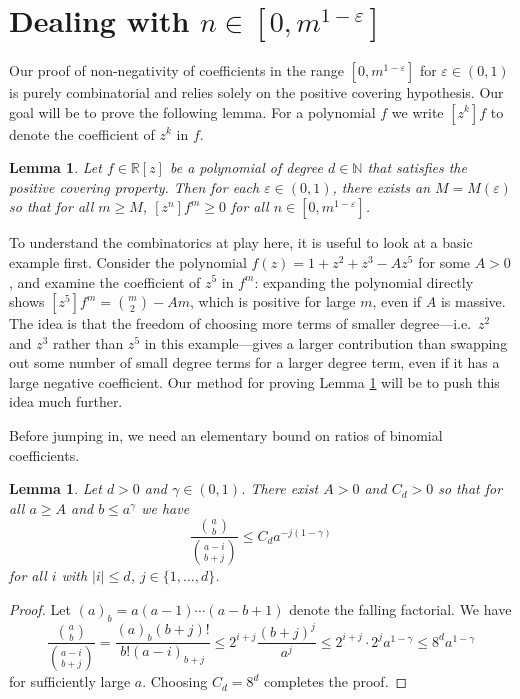 \documentclass{daj}
\def\eps{\varepsilon}
\newcommand{\R}{\mathbb{R}}
\def\N{\mathbb{N}}
\newtheorem{lemma}[theorem]{Lemma}
\theoremstyle{definition}
\theoremstyle{remark}
\begin{document}
\section{Dealing with $n \in [0,m^{1-\eps}]$} \label{sec:small-coefficients}

Our proof of non-negativity of coefficients in the range $[0,m^{1-\eps}]$ for $\eps \in (0,1)$ is purely combinatorial and relies solely on the positive covering hypothesis.  Our goal will be to prove the following lemma.  For a polynomial $f$ we write $[z^k] f$ to denote the coefficient of $z^k$ in $f$. 

\begin{lemma}\label{lem:poly-many}
	Let $f \in \R[z]$ be a polynomial of degree $d \in \N$ that satisfies the positive covering property.  Then for each $\eps \in (0,1)$, there exists an $M = M(\eps)$ so that for all $m \geq M$, $[z^n] f^m \geq 0$ for all $n \in [0, m^{1-\eps}]$. 
\end{lemma}

To understand the combinatorics at play here, it is useful to look at a basic example first.  Consider the polynomial $f(z) = 1 + z^2 + z^3 - Az^5$ for some $A > 0$, and examine the coefficient of $z^5$ in $f^m$: expanding the polynomial directly shows $[z^5] f^m = \binom{m}{2} - A m$, which is positive for large $m$, even if $A$ is massive.  The idea is that the freedom of choosing more terms of smaller degree---i.e.~$z^2$ and $z^3$ rather than $z^5$ in this example---gives a larger contribution than swapping out some number of small degree terms for a larger degree term, even if it has a large negative coefficient. Our method for proving Lemma \ref{lem:poly-many} will be to push this idea much further. 

Before jumping in, we need an elementary bound on ratios of binomial coefficients.

\begin{lemma}\label{lem:gen-binomial-bound}
	Let $d > 0$ and $\gamma \in (0,1)$.  There exist $A > 0$  and $C_d > 0$ so that for all $a \geq A$ and $b \leq a^{\gamma}$ we have $$\frac{\binom{a}{b}}{\binom{a-i}{b + j}} \leq  C_d a^{-j(1 - \gamma)}$$
	for all $i$ with $|i| \leq d$, $j \in \{1,\ldots,d\}$.
\end{lemma}
\begin{proof} Let $(a)_b = a(a-1)\cdots(a - b+1)$ denote the falling factorial. We have 
$$\frac{\binom{a}{b}}{\binom{a-i}{b + j}} = \frac{(a)_b (b + j)!}{b! (a-i)_{b+j}} \leq 2^{i+j} \frac{(b+j)^j}{a^j} \leq 2^{i+j} \cdot 2^j a^{1 - \gamma} \leq 8^d a^{1-\gamma}$$
	for sufficiently large $a$.  Choosing $C_d = 8^d$ completes the proof.
\end{proof}
\end{document}
